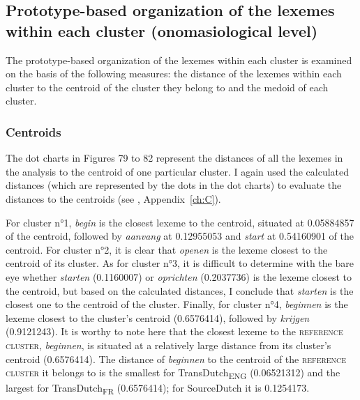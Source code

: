 \subsection{Prototype-based organization of the lexemes within each cluster (onomasiological level)}
\label{sec:4.4.3}  
The prototype-based organization of the lexemes within each cluster is examined on the basis of the following measures: the distance of the lexemes within each cluster to the centroid of the cluster they belong to and the medoid of each cluster.


\subsubsection{Centroids}
\label{sec:4.4.3.1}  
The dot charts in Figures 79 to 82 represent the distances of all the lexemes in the analysis to the centroid of one particular cluster. I again used the calculated distances (which are represented by the dots in the dot charts) to evaluate the distances to the centroids (see , Appendix~\ref{ch:C}).

For cluster n°1, \textit{begin} is the closest lexeme to the centroid, situated at 0.05884857 of the centroid, followed by \textit{aanvang} at 0.12955053 and \textit{start} at 0.54160901 of the centroid. For cluster n°2, it is clear that \textit{openen} is the lexeme closest to the centroid of its cluster. As for cluster n°3, it is difficult to determine with the bare eye whether \textit{starten} (0.1160007) or \textit{oprichten} (0.2037736) is the lexeme closest to the centroid, but based on the calculated distances, I conclude that \textit{starten} is the closest one to the centroid of the cluster. Finally, for cluster n°4, \textit{beginnen} is the lexeme closest to the cluster’s centroid (0.6576414), followed by \textit{krijgen} (0.9121243). It is worthy to note here that the closest lexeme to the \textsc{reference cluster}, \textit{beginnen}, is situated at a relatively large distance from its cluster’s centroid (0.6576414). The distance of \textit{beginnen} to the centroid of the \textsc{reference cluster} it belongs to is the smallest for TransDutch\textsubscript{ENG} (0.06521312) and the largest for TransDutch\textsubscript{FR} (0.6576414); for SourceDutch it is 0.1254173.

